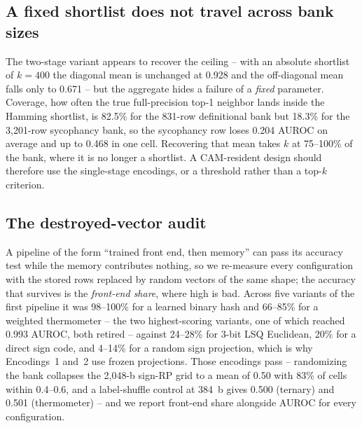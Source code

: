 \documentclass[conference]{IEEEtran}
\newcommand{\cam}{{CAM}\xspace}
\newcommand{\auroc}{{AUROC}\xspace}
\newcommand{\signrp}{{sign-RP}\xspace}
\begin{document}
\subsection{A fixed shortlist does not travel across bank sizes}
\label{subsec:Shortlist}
The two-stage variant appears to recover the ceiling -- with an
absolute shortlist of $k=400$ the diagonal mean is unchanged at
0.928 and the off-diagonal mean falls only to 0.671 -- but the
aggregate hides a failure of a \emph{fixed} parameter. Coverage, how
often the true full-precision top-1 neighbor lands inside the
Hamming shortlist, is 82.5\% for the 831-row definitional bank but
18.3\% for the 3{,}201-row sycophancy bank, so the sycophancy row
loses 0.204 \auroc on average and up to 0.468 in one cell.
Recovering that mean takes $k$ at 75--100\% of the bank, where it is
no longer a shortlist. A \cam-resident design should therefore use the
single-stage encodings, or a threshold rather than a top-$k$
criterion.

\subsection{The destroyed-vector audit}
\label{subsec:Audit}
\label{subsec:AuditResults}
A pipeline of the form ``trained front end, then memory'' can pass
its accuracy test while the memory contributes nothing, so we
re-measure every configuration with the stored rows replaced by
random vectors of the same shape; the accuracy that survives is the
\emph{front-end share}, where high is bad. Across five variants of
the first pipeline it was 98--100\% for a learned binary hash and
66--85\% for a weighted thermometer -- the two highest-scoring
variants, one of which reached 0.993 \auroc, both retired -- against
24--28\% for 3-bit LSQ Euclidean, 20\% for a direct sign code, and
4--14\% for a random sign projection, which is why Encodings~1 and~2
use frozen projections. Those encodings pass -- randomizing the bank collapses the 2{,}048-b
\signrp grid to a mean of 0.50 with 83\% of cells within 0.4--0.6,
and a label-shuffle control at 384~b gives 0.500 (ternary) and 0.501
(thermometer) -- and we report front-end share alongside \auroc for
every configuration.

\end{document}
